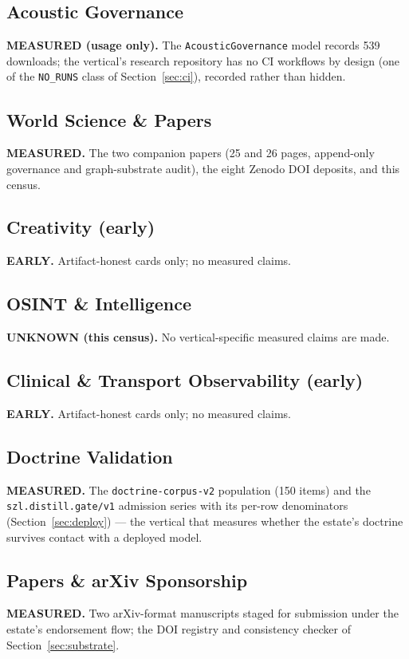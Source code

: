 \subsection{Acoustic Governance}
\textbf{MEASURED (usage only).} The \texttt{AcousticGovernance} model records 539 downloads; the vertical's research repository has no CI workflows by design (one of the \texttt{NO\_RUNS} class of Section~\ref{sec:ci}), recorded rather than hidden.

\subsection{World Science \& Papers}
\textbf{MEASURED.} The two companion papers (25 and 26 pages, append-only governance and graph-substrate audit), the eight Zenodo DOI deposits, and this census.

\subsection{Creativity (early)}
\textbf{EARLY.} Artifact-honest cards only; no measured claims.

\subsection{OSINT \& Intelligence}
\textbf{UNKNOWN (this census).} No vertical-specific measured claims are made.

\subsection{Clinical \& Transport Observability (early)}
\textbf{EARLY.} Artifact-honest cards only; no measured claims.

\subsection{Doctrine Validation}
\textbf{MEASURED.} The \texttt{doctrine-corpus-v2} population (150 items) and the \texttt{szl.distill.gate/v1} admission series with its per-row denominators (Section~\ref{sec:deploy}) --- the vertical that measures whether the estate's doctrine survives contact with a deployed model.

\subsection{Papers \& arXiv Sponsorship}
\textbf{MEASURED.} Two arXiv-format manuscripts staged for submission under the estate's endorsement flow; the DOI registry and consistency checker of Section~\ref{sec:substrate}.

